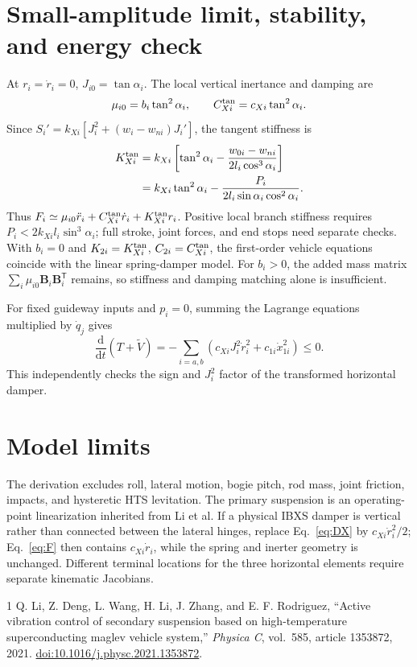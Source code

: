 \documentclass[a4paper,11pt]{article}
\numberwithin{equation}{section}
\newcommand{\bB}{\bm B}
\newcommand{\dd}{\mathrm d}
\newcommand{\T}{\mathsf T}
\begin{document}
\section{Small-amplitude limit, stability, and energy check}
At $r_i=\dot r_i=0$, $J_{i0}=\tan\alpha_i$. The local vertical inertance and damping are
\begin{equation}
\mu_{i0}=b_i\tan^2\alpha_i,
\qquad C_{Xi}^{\rm tan}=c_{Xi}\tan^2\alpha_i.\label{eq:localBC}
\end{equation}
Since $S_i'=k_{Xi}[J_i^2+(w_i-w_{ni})J_i']$, the tangent stiffness is
\begin{align}
K_{Xi}^{\rm tan}
&=k_{Xi}\left[\tan^2\alpha_i-
\frac{w_{0i}-w_{ni}}{2l_i\cos^3\alpha_i}\right]\notag\\
&=k_{Xi}\tan^2\alpha_i-
\frac{P_i}{2l_i\sin\alpha_i\cos^2\alpha_i}.\label{eq:Ktan}
\end{align}
Thus $F_i\simeq\mu_{i0}\ddot r_i+C_{Xi}^{\rm tan}\dot r_i+K_{Xi}^{\rm tan}r_i$. Positive local branch stiffness requires $P_i<2k_{Xi}l_i\sin^3\alpha_i$; full stroke, joint forces, and end stops need separate checks. With $b_i=0$ and $K_{2i}=K_{Xi}^{\rm tan}$, $C_{2i}=C_{Xi}^{\rm tan}$, the first-order vehicle equations coincide with the linear spring-damper model. For $b_i>0$, the added mass matrix $\sum_i\mu_{i0}\bB_i\bB_i^\T$ remains, so stiffness and damping matching alone is insufficient.

For fixed guideway inputs and $p_i=0$, summing the Lagrange equations multiplied by $\dot q_j$ gives
\begin{equation}
\frac{\dd}{\dd t}(T+\widetilde V)
=-\sum_{i=a,b}\left(c_{Xi}J_i^2\dot r_i^2+c_{1i}\dot x_{1i}^2\right)\le0.\label{eq:energy}
\end{equation}
This independently checks the sign and $J_i^2$ factor of the transformed horizontal damper.

\section{Model limits}
The derivation excludes roll, lateral motion, bogie pitch, rod mass, joint friction, impacts, and hysteretic HTS levitation. The primary suspension is an operating-point linearization inherited from Li et al. If a physical IBXS damper is vertical rather than connected between the lateral hinges, replace Eq.~\eqref{eq:DX} by $c_{Xi}\dot r_i^2/2$; Eq.~\eqref{eq:F} then contains $c_{Xi}\dot r_i$, while the spring and inerter geometry is unchanged. Different terminal locations for the three horizontal elements require separate kinematic Jacobians.

\begin{thebibliography}{1}
 Q. Li, Z. Deng, L. Wang, H. Li, J. Zhang, and E. F. Rodriguez,
``Active vibration control of secondary suspension based on high-temperature superconducting maglev vehicle system,''
\emph{Physica C}, vol.~585, article 1353872, 2021.
\href{https://doi.org/10.1016/j.physc.2021.1353872}{doi:10.1016/j.physc.2021.1353872}.
\end{thebibliography}
\end{document}

